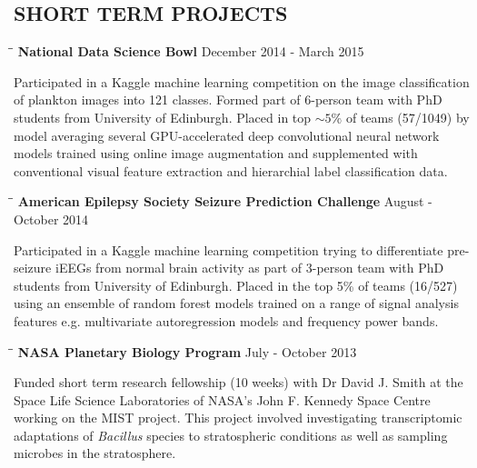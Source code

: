 \documentclass{res}
\begin{document}
\begin{resume}
\section{SHORT TERM PROJECTS}

   \vspace{-0.05in} 

   \begin{tabbing}
   \hspace{2in}\= \hspace{2.6in}\= \kill 
   {\bf National Data Science Bowl} \> \>        December 2014 - March 2015\\
     \end{tabbing}\vspace{-20pt}      
     Participated in a Kaggle machine learning competition on the image classification of plankton images into 121 classes. Formed part of 6-person team with PhD students from University of Edinburgh. 
     Placed in top $\sim5\%$ of teams (57/1049) by model averaging several GPU-accelerated deep convolutional neural network models trained using online image augmentation and supplemented with conventional visual feature extraction and hierarchial label classification data.
     
   \vspace{-0.1in} 
   \begin{tabbing}
   \hspace{2in}\= \hspace{2.6in}\= \kill 
   {\bf American Epilepsy Society Seizure Prediction Challenge} \> \>        August - October 2014\\
     \end{tabbing}\vspace{-20pt}      
     Participated in a Kaggle machine learning competition trying to differentiate pre-seizure iEEGs from normal brain activity as part of 3-person team with PhD students from University of Edinburgh. 
     Placed in the top 5\% of teams (16/527) using an ensemble of random forest models trained on a range of signal analysis features e.g. multivariate autoregression models and frequency power bands.

   \vspace{-0.1in} 
   \begin{tabbing}
   \hspace{2in}\= \hspace{2.6in}\= \kill 
    {\bf NASA Planetary Biology Program} \> \>        July - October 2013\\
     \end{tabbing}\vspace{-20pt}      
     Funded short term research fellowship (10 weeks) with Dr David J. Smith at the Space Life Science Laboratories of NASA's John F. Kennedy Space Centre working on the MIST project. This project involved investigating transcriptomic adaptations of \textit{Bacillus} species to stratospheric conditions as well as sampling microbes in the stratosphere.


\end{resume}
\end{document}
